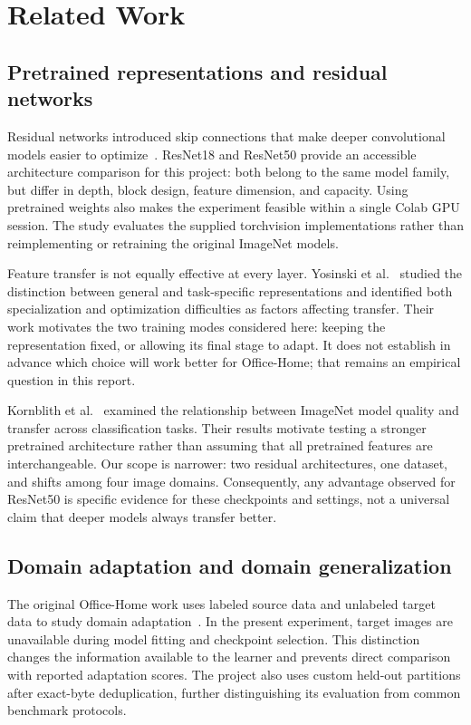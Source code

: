 \documentclass[10pt,a4paper]{article}
\begin{document}
\section{Related Work}
\subsection{Pretrained representations and residual networks}
Residual networks introduced skip connections that make deeper convolutional models easier to optimize~\cite{resnet}. ResNet18 and ResNet50 provide an accessible architecture comparison for this project: both belong to the same model family, but differ in depth, block design, feature dimension, and capacity. Using pretrained weights also makes the experiment feasible within a single Colab GPU session. The study evaluates the supplied torchvision implementations rather than reimplementing or retraining the original ImageNet models.

Feature transfer is not equally effective at every layer. Yosinski et al.~\cite{yosinski} studied the distinction between general and task-specific representations and identified both specialization and optimization difficulties as factors affecting transfer. Their work motivates the two training modes considered here: keeping the representation fixed, or allowing its final stage to adapt. It does not establish in advance which choice will work better for Office-Home; that remains an empirical question in this report.

Kornblith et al.~\cite{kornblith} examined the relationship between ImageNet model quality and transfer across classification tasks. Their results motivate testing a stronger pretrained architecture rather than assuming that all pretrained features are interchangeable. Our scope is narrower: two residual architectures, one dataset, and shifts among four image domains. Consequently, any advantage observed for ResNet50 is specific evidence for these checkpoints and settings, not a universal claim that deeper models always transfer better.

\subsection{Domain adaptation and domain generalization}
The original Office-Home work uses labeled source data and unlabeled target data to study domain adaptation~\cite{officehome}. In the present experiment, target images are unavailable during model fitting and checkpoint selection. This distinction changes the information available to the learner and prevents direct comparison with reported adaptation scores. The project also uses custom held-out partitions after exact-byte deduplication, further distinguishing its evaluation from common benchmark protocols.
\end{document}
